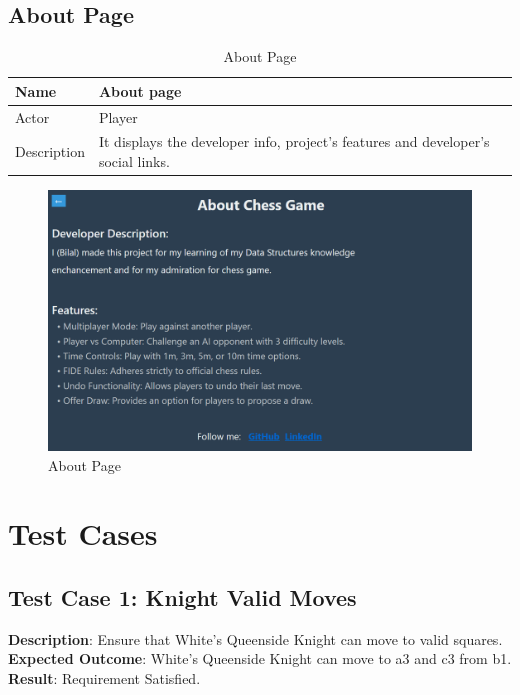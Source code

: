 \documentclass[a4paper,12pt]{article}
\begin{document}
\subsection{About Page}

\begin{longtable}{|m{}|m{}|}
    \caption{About Page} \\
    \hline
    Name & About page \\
    \hline
    Actor & Player \\
    \hline
    Description & It displays the developer info, project's features and developer's social links. \\ 
    \hline
\end{longtable}

\begin{figure}[H]
    \centering
    \includegraphics[width=0.7\linewidth]{Images/Use Cases/aboutPage.png}
    \caption{About Page}
    \label{fig:aboutPage}
\end{figure}
    
\section{Test Cases}

\subsection{Test Case 1: Knight Valid Moves}
\textbf{Description}: Ensure that White's Queenside Knight can move to valid squares.\\
\textbf{Expected Outcome}: White's Queenside Knight can move to a3 and c3 from b1.\\
\textbf{Result}: Requirement Satisfied.
\end{document}
